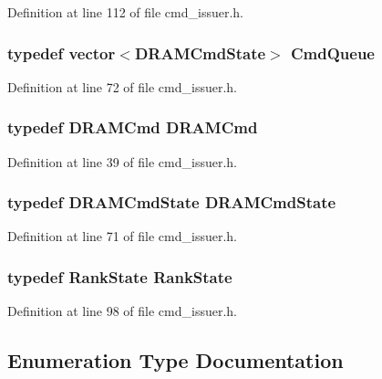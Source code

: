 Definition at line 112 of file cmd\_\-issuer.h.
\subsubsection[{CmdQueue}]{\setlength{\rightskip}{0pt plus 5cm}typedef vector$<${\bf DRAMCmdState}$>$ {\bf CmdQueue}}\label{cmd__issuer_8h_59247f947a613beb68c3253b51c984c1}




Definition at line 72 of file cmd\_\-issuer.h.
\subsubsection[{DRAMCmd}]{\setlength{\rightskip}{0pt plus 5cm}typedef {\bf DRAMCmd} {\bf DRAMCmd}}\label{cmd__issuer_8h_bce082462985d2aa28ffe56cfc739c5d}




Definition at line 39 of file cmd\_\-issuer.h.
\subsubsection[{DRAMCmdState}]{\setlength{\rightskip}{0pt plus 5cm}typedef {\bf DRAMCmdState} {\bf DRAMCmdState}}\label{cmd__issuer_8h_45d3a88c90ce1a142c7c4d3a84586a8e}




Definition at line 71 of file cmd\_\-issuer.h.
\subsubsection[{RankState}]{\setlength{\rightskip}{0pt plus 5cm}typedef {\bf RankState} {\bf RankState}}\label{cmd__issuer_8h_ecc0a39d516477328b868bdc2802de49}




Definition at line 98 of file cmd\_\-issuer.h.

\subsection{Enumeration Type Documentation}
